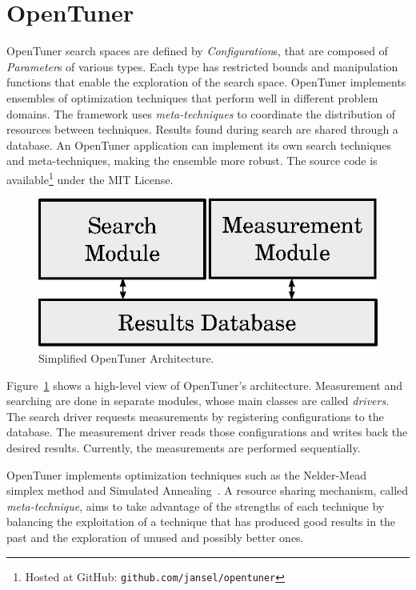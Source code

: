 \documentclass[12pt]{article}
\begin{document}
\section{OpenTuner} \label{sec:ot}

OpenTuner search spaces are defined by \emph{Configuration}s, that are composed
of \emph{Parameter}s of various types. Each type has restricted bounds and
manipulation functions that enable the exploration of the search space.
OpenTuner implements ensembles of optimization techniques that
perform well in different problem domains. The framework uses
\emph{meta-techniques} to coordinate the distribution of resources
between techniques.
Results found during search are shared through a
database. An OpenTuner application can implement its own search
techniques and meta-techniques, making the ensemble more robust.
The source code is available\footnote{Hosted at GitHub:
\texttt{\scriptsize github.com/jansel/opentuner}} under the MIT License.

\begin{figure}[htpb]
    \centering
    \includegraphics[scale=.62]{opentuner-implementation}
    \caption{Simplified OpenTuner Architecture.}
    \label{fig:ot-imp}
\end{figure}

Figure~\ref{fig:ot-imp} shows a high-level view of OpenTuner's architecture.
Measurement and searching are done in separate modules, whose main classes are
called \emph{drivers}. The search driver requests measurements by registering
configurations to the database. The measurement driver reads those
configurations and writes back the desired results.  Currently, the
measurements are performed sequentially.

OpenTuner implements optimization techniques such as the
Nelder-Mead~\cite{nelder1965simplex} simplex method and Simulated
Annealing~\cite{kirkpatrick1983optimization}. A resource sharing mechanism,
called \emph{meta-technique}, aims to take advantage of the strengths of each
technique by balancing the exploitation of a technique that has produced good
results in the past and the exploration of unused and possibly better ones.
\end{document}
